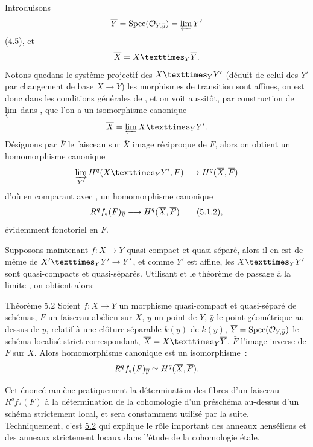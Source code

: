 \documentclass[10pt]{../fichiers-configuration-latex/smfart}
\begin{document}
Introduisons
$$
\overline{Y} = \operatorname{Spec} ({\mathcal O}_{Y, \overline{y}}) = \varprojlim Y'
$$
(\cf \hyperref[VIII.subsec4.5]{4.5}), et
$$
\bar{X} = \fprod{X}{\bar{Y}}{Y}{\quoi}.
$$
Notons que\pageoriginale dans le système projectif des
$\fprod{X}{Y'}{Y}$ (déduit
de celui des $Y'$ par changement de base $X \to Y$) les morphismes de
transition sont affines, on est donc dans les conditions générales de
, et on voit aussitôt, par construction de $\varprojlim$ dans
\loccit, que l'on a un isomorphisme canonique
$$
\bar{X} = \varprojlim \fprod{X}{Y'}{Y}{\quoi}.
$$
Désignons par $\bar{F}$ le faisceau sur $\bar{X}$ image réciproque de
$F$, alors on obtient un homomorphisme canonique
$$
\varinjlim_{Y'} H^q (\fprod{X}{Y'}{Y}, F) \to H^q (\bar{X}, \bar{F})
$$
d'où en comparant avec , un homomorphisme canonique
\begin{equation*}
R^q f_{\ast} (F)_{\bar{y}} \to H^q (\bar{X}, \bar{F})\tag{5.1.2}{\quoi},
\end{equation*}
évidemment fonctoriel en $F$.

Supposons maintenant $f : X \to Y$ quasi-compact et quasi-séparé,
alors il en est de même de $\fprod{X'}{Y'}{Y} \to Y'$, et comme $Y'$
est affine, les $\fprod{X}{Y'}{Y}$ sont quasi-compacts et
quasi-séparés. Utilisant  et le théorème de passage à la limite
, on obtient alors:

\begin{enonce*}{Théorème 5.2}
Soient $f : X \to Y$ un morphisme quasi-compact et quasi-séparé de
schémas, $F$ un faisceau abélien sur $X$, $y$ un point de $Y$,
$\bar{y}$ le point géométrique au-dessus de $y$, relatif
à une clôture séparable $k(\bar{y})$ de $k(y)$, $\overline{Y} = \operatorname{Spec}
({\mathcal O}_{Y,\overline{y}})$ le schéma localisé strict correspondant, $\bar{X} =
  \fprod{X}{\bar{Y}}{Y}$, $\bar{F}$ l'image inverse de $F$ sur
  $\bar{X}$. Alors homomorphisme canonique  est un
  isomorphisme :
$$
R^q f_{\ast}(F)_{\overline{y}} \simeq H^q (\overline{X}, \overline{F}){}.
$$
\end{enonce*}

Cet énoncé ramène pratiquement la détermination des fibres d'un
faisceau\pageoriginale $R^q f_{\ast}(F)$ à la détermination de la
cohomologie
d'un préschéma au-dessus d'un schéma
strictement local, et sera constamment utilisé par la
suite. Techniquement, c'est \hyperref[VIII.thm5.2]{5.2} qui explique le rôle important des
anneaux henséliens et des anneaux strictement locaux dans l'étude de
la cohomologie étale.
\end{document}
